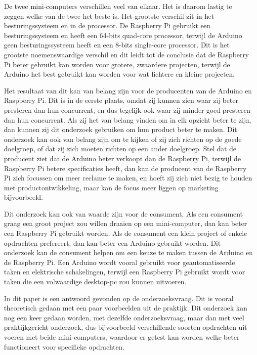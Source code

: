 \documentclass[a4paper, dutch, abstract=true]{scrartcl}
\begin{document}
De twee mini-computers verschillen veel van elkaar.
Het is daarom lastig te zeggen welke van de twee het beste is.
Het grootste verschil zit in het besturingssysteem en in de processor.
De Raspberry Pi gebruikt een besturingssysteem en heeft een 64-bits quad-core processor, terwijl de
Arduino geen besturingssysteem heeft en een 8-bits single-core processor.
Dit is het grootste noemenswaardige verschil en dit leidt tot de conclusie dat de Raspberry Pi beter
gebruikt kan worden voor grotere, zwaardere projecten, terwijl de Arduino het best gebruikt kan
worden voor wat lichtere en kleine projecten.

Het resultaat van dit kan van belang zijn voor de producenten van de Arduino en Raspberry Pi.
Dit is in de eerste plaats, omdat zij kunnen zien waar zij beter presteren dan hun concurrent, en
dus tegelijk ook waar zij minder goed presteren dan hun concurrent.
Als zij het van belang vinden om in elk opzicht beter te zijn, dan kunnen zij dit onderzoek
gebruiken om hun product beter te maken.
Dit onderzoek kan ook van belang zijn om te kijken of zij zich richten op de goede doelgroep, of dat
zij zich moeten richten op een ander doelgroep.
Stel dat de producent ziet dat de Arduino beter verkoopt dan de Raspberry Pi, terwijl de Raspberry
Pi betere specificaties heeft, dan kan de producent van de Raspberry Pi zich focussen om meer
reclame te maken, en hoeft zij zich niet bezig te houden met productontwikkeling, maar kan de focus
meer liggen op marketing bijvoorbeeld.

Dit onderzoek kan ook van waarde zijn voor de consument.
Als een consument graag een groot project zou willen draaien op een mini-computer, dan kan beter een
Raspberry Pi gebruikt worden.
Als de consument een klein project of enkele opdrachten prefereert, dan kan beter een Arduino
gebruikt worden.
Dit onderzoek kan de consument helpen om een keuze te maken tussen de Arduino en de Raspberry Pi.
Een Arduino wordt vooral gebruikt voor geautomatiseerde taken en elektrische schakelingen, terwijl
een Raspberry Pi gebruikt wordt voor taken die een volwaardige desktop-pc zou kunnen uitvoeren.

In dit paper is een antwoord gevonden op de onderzoeksvraag.
Dit is vooral theoretisch gedaan met een paar voorbeelden uit de praktijk.
Dit onderzoek kan nog een keer gedaan worden, met dezelfde onderzoeksvraag, maar dan met veel
praktijkgericht onderzoek, dus bijvoorbeeld verschillende soorten opdrachten uit voeren met beide
mini-computers, waardoor er getest kan worden welke beter functioneert voor specifieke opdrachten.
\end{document}
